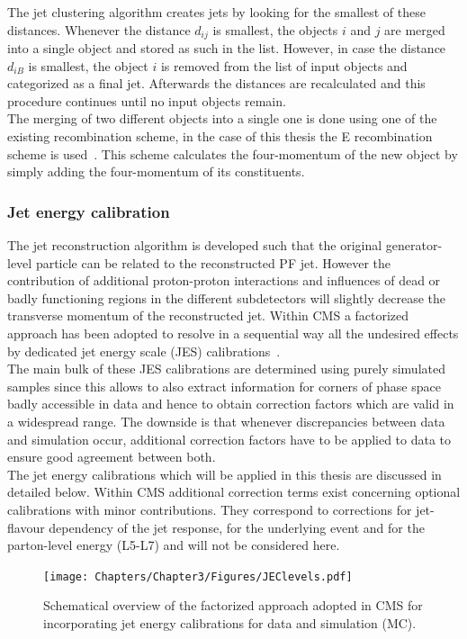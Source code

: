 The jet clustering algorithm creates jets by looking for the smallest of these distances. Whenever the distance $d_{ij}$ is smallest, the objects $i$ and $j$ are merged into a single object and stored as such in the list. However, in case the distance $d_{iB}$ is smallest, the object $i$ is removed from the list of input objects and categorized as a final jet. Afterwards the distances are recalculated and this procedure continues until no input objects remain.
\\
The merging of two different objects into a single one is done using one of the existing recombination scheme, in the case of this thesis the E recombination scheme is used~\cite{}. This scheme calculates the four-momentum of the new object by simply adding the four-momentum of its constituents. %

\subsubsection*{Jet energy calibration}

The jet reconstruction algorithm is developed such that the original generator-level particle can be related to the reconstructed PF jet. However the contribution of additional proton-proton interactions and influences of dead or badly functioning regions in the different subdetectors will slightly decrease the transverse momentum of the reconstructed jet.
Within CMS a factorized approach has been adopted to resolve in a sequential way all the undesired effects by dedicated jet energy scale (JES) calibrations~\cite{}.
\\
The main bulk of these JES calibrations are determined using purely simulated samples since this allows to also extract information for corners of phase space badly accessible in data and hence to obtain correction factors which are valid in a widespread range. The downside is that whenever discrepancies between data and simulation occur, additional correction factors have to be applied to data to ensure good agreement between both.
\\
The jet energy calibrations which will be applied in this thesis are discussed in detailed below. 
Within CMS additional correction terms exist concerning optional calibrations with minor contributions. They correspond to corrections for jet-flavour dependency of the jet response, for the underlying event and for the parton-level energy (L5-L7) and will not be considered here.
\begin{figure}[h!t]
 \centering
 \texttt{[image: Chapters/Chapter3/Figures/JEClevels.pdf]}
 \caption{Schematical overview of the factorized approach adopted in CMS for incorporating jet energy calibrations for data and simulation (MC).}
 \label{fig::JEClevels}
\end{figure}

